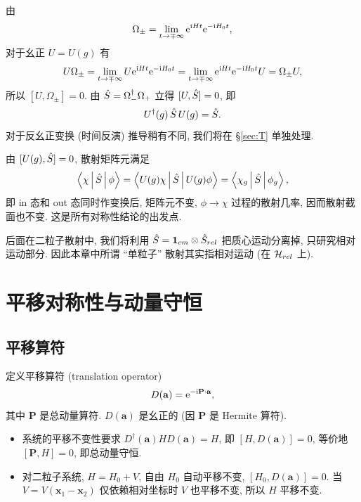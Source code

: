 \begin{proof*}
由
\[
\Omega_\pm =\lim_{t\to \mp\infty} \mathrm{e}^{\mathrm{i} Ht}\mathrm{e}^{-\mathrm{i} H_0 t},
\]
对于幺正 $U=U(g)$ 有
\[
U\Omega_\pm = \lim_{t\to \mp\infty} U \mathrm{e}^{\mathrm{i} Ht}\mathrm{e}^{-\mathrm{i} H_0 t}
=\lim_{t\to \mp\infty} \mathrm{e}^{\mathrm{i} Ht}\mathrm{e}^{-\mathrm{i} H_0 t} U =\Omega_\pm U,
\]
所以 $[U,\Omega_\pm]=0$. 由 $\hat{S}=\Omega_-^\dagger \Omega_+$ 立得 $[U,\hat{S}]=0$, 即
\begin{equation}
U^\dagger(g)\,\hat{S}\,U(g)=\hat{S}.
\end{equation}
对于反幺正变换 (时间反演) 推导稍有不同, 我们将在 \S\ref{sec:T} 单独处理.
\end{proof*}

由 $[U(g),\hat{S}]=0$, 散射矩阵元满足
\begin{equation}\label{eq:S-invariance}
\left\langle \chi \,\middle|\, \hat{S} \,\middle|\, \phi \right\rangle=\left\langle U(g)\chi \,\middle|\, \hat{S} \,\middle|\, U(g)\phi \right\rangle=\left\langle \chi_g \,\middle|\, \hat{S} \,\middle|\, \phi_g \right\rangle,
\end{equation}
即 in 态和 out 态同时作变换后, 矩阵元不变, $\phi\to\chi$ 过程的散射几率, 因而散射截面也不变. 这是所有对称性结论的出发点.

\begin{remark}
后面在二粒子散射中, 我们将利用 $\hat{S}=\mathbf{1}_{cm}\otimes \hat{S}_{rel}$ 把质心运动分离掉, 只研究相对运动部分. 因此本章中所谓 ``单粒子'' 散射其实指相对运动 (在 $\mathcal{H}_{rel}$ 上).
\end{remark}


\section{平移对称性与动量守恒}\label{sec:translation}

\subsection{平移算符}

定义平移算符 (translation operator)
\begin{equation}
D(\mathbf{a})=\mathrm{e}^{-\mathrm{i} \mathbf{P}\cdot\mathbf{a}},
\end{equation}
其中 $\mathbf{P}$ 是总动量算符. $D(\mathbf{a})$ 是幺正的 (因 $\mathbf{P}$ 是 Hermite 算符).

\begin{itemize}
  \item 系统的平移不变性要求 $D^\dagger(\mathbf{a})HD(\mathbf{a})=H$, 即 $[H,D(\mathbf{a})]=0$, 等价地 $[\mathbf{P},H]=0$, 即总动量守恒.
  \item 对二粒子系统, $H=H_0+V$, 自由 $H_0$ 自动平移不变, $[H_0,D(\mathbf{a})]=0$. 当 $V=V(\mathbf{x}_1-\mathbf{x}_2)$ 仅依赖相对坐标时 $V$ 也平移不变, 所以 $H$ 平移不变.
\end{itemize}

